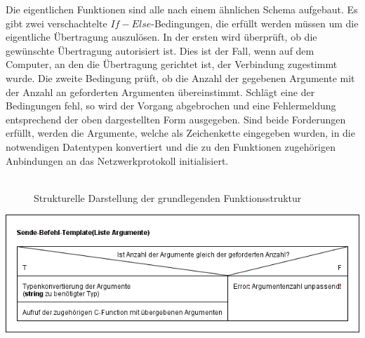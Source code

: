 Die eigentlichen Funktionen sind alle nach einem ähnlichen Schema aufgebaut. 
Es gibt zwei verschachtelte $If-Else$-Bedingungen, die erfüllt werden müssen um die eigentliche Übertragung auszulösen. 
In der ersten wird überprüft, ob die gewünschte Übertragung autorisiert ist. 
Dies ist der Fall, wenn auf dem Computer, an den die Übertragung gerichtet ist, der Verbindung zugestimmt wurde. 
Die zweite Bedingung prüft, ob die Anzahl der gegebenen Argumente mit der Anzahl an geforderten Argumenten übereinstimmt. 
Schlägt eine der Bedingungen fehl, so wird der Vorgang abgebrochen und eine Fehlermeldung entsprechend der oben dargestellten Form ausgegeben. 
Sind beide Forderungen erfüllt, werden die Argumente, welche als Zeichenkette eingegeben wurden, in die notwendigen Datentypen konvertiert und die zu den Funktionen zugehörigen Anbindungen an das Netzwerkprotokoll initialisiert.  \\\hfill\\

\begin{figure}[h!]
\label{fkts}
\caption{Strukturelle Darstellung der grundlegenden Funktionsstruktur}
\end{figure}
\includegraphics[scale=0.75]{inp}\\

%
